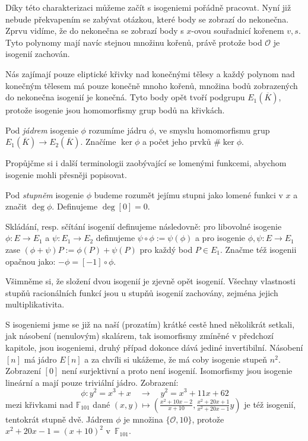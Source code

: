 \documentclass[12pt]{report}
\begin{document}
Díky této charakterizaci můžeme začít s isogeniemi pořádně pracovat. Nyní již nebude překvapením se zabývat otázkou, které body se zobrazí do nekonečna. Zprvu vidíme, že do nekonečna se zobrazí body s $x$-ovou souřadnicí kořenem $v,s$. Tyto polynomy mají navíc stejnou množinu kořenů, právě protože bod $\mathcal{O}$ je isogenií zachován. 

Nás zajímají pouze eliptické křivky nad konečnými tělesy a každý polynom nad konečným tělesem má pouze konečně mnoho kořenů, množina bodů zobrazených do nekonečna isogenií je konečná. Tyto body opět tvoří podgrupu $E_1 (\overline{K})$, protože isogenie jsou homomorfismy grup bodů na křivkách.

\begin{definice}
Pod \textit{jádrem} isogenie $\phi$ rozumíme jádru $\phi$, ve smyslu homomorfismu grup $E_1 (\overline{K})\longrightarrow E_2(\overline{K})$. Značíme $\ker \phi$ a počet jeho prvků $\# \ker \phi$. 
\end{definice}

Propůjčme si i další terminologii zaobývající se lomenými funkcemi, abychom isogenie mohli přesněji popisovat.

\begin{definice}
Pod \textit{stupněm} isogenie $\phi$ budeme rozumět jejímu stupni jako lomené funkci v $x$ a značit $\deg \phi$. Definujeme $\deg [0] = 0$. 
\end{definice}
 
\begin{znaceni}
Skládání, resp. sčítání isogenií definujeme následovně: pro libovolné isogenie $\phi : E \longrightarrow E_1$ a $\psi : E_1 \longrightarrow E_2$ definujeme $\psi \circ \phi  := \psi(\phi)$ a pro isogenie $\phi,\psi : E \longrightarrow E_1$ zase $(\phi + \psi)P := \phi(P)+\psi(P)$ pro každý bod $P \in E_1$. Značme též isogenii opačnou jako: $- \phi  = [-1] \circ \phi$.
\end{znaceni}

Všimněme si, že složení dvou isogenií je zjevně opět isogenií. Všechny vlastnosti stupňů racionálních funkcí jsou u stupňů isogenií zachovány, zejména jejich multiplikativita.


S isogeniemi jsme se již na naší (prozatím) krátké cestě hned několikrát setkali, jak násobení (nenulovým) skalárem, tak isomorfismy zmíněné v předchozí kapitole, jsou isogeniemi, druhý případ dokonce dává jediné invertibilní. Násobení $[n]$ má jádro $E[n]$ a za chvíli si ukážeme, že má coby isogenie stupeň $n^2$. Zobrazení $[0]$ není surjektivní a proto není isogenií. Isomorfismy jsou isogenie lineární a mají pouze triviální jádro. Zobrazení:
\begin{equation*}
\phi : y^2 = x^3+x \quad \longrightarrow \quad y^2 =  x^3 + 11x + 62
\end{equation*}
mezi křivkami nad $\mathbb{F}_{101}$ dané $(x,y) \mapsto \left(\frac{x^2 + 10x - 2}{x+10},\frac{x^2  + 20x + 1}{x^2 + 20x - 1} y\right)$ je též isogenií, tentokrát stupně dvě. Jádrem $\phi$ je množina $\lbrace \mathcal{O},10 \rbrace$, protože $x^2 + 20x - 1 = (x+10)^2$ v~$\mathbb{F}_{101}$.
\end{document}
